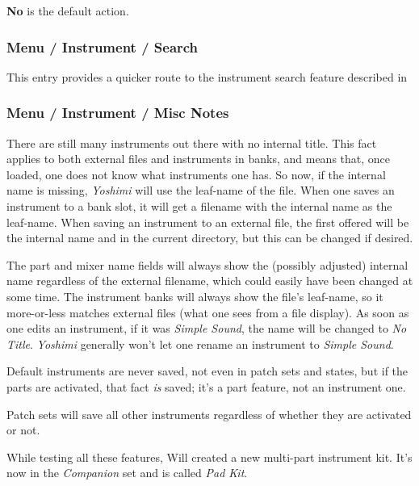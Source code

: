    \textbf{No} is the default action.

\subsubsection{Menu / Instrument / Search}
\label{subsubsec:menu_instrument_search}

   This entry provides a quicker route to the instrument search feature described
   in 
\subsubsection{Menu / Instrument / Misc Notes}
\label{subsubsec:menu_instrument_misc_notes}

   There are still many instruments out there with
   no internal title. This fact applies to both external files and instruments
   in banks, and means that, once loaded, one does not know what instruments
   one has. So now, if the internal name is missing, \textsl{Yoshimi} will use
   the leaf-name of the file.  When one saves an instrument to a bank slot, it
   will get a filename with the internal name as the leaf-name.  When saving
   an instrument to an external file, the first offered will be the internal
   name and in the current directory, but this can be changed if desired.

   The part and mixer name fields will always show the (possibly adjusted)
   internal name regardless of the external filename, which could easily have
   been changed at some time.  The instrument banks will always show the file's
   leaf-name, so it more-or-less matches external files (what one sees from a
   file display).  As soon as one edits an instrument, if it was \textsl{Simple
   Sound}, the name will be changed to \textsl{No Title}.  \textsl{Yoshimi}
   generally won't let one rename an instrument to \textsl{Simple Sound}.

   Default instruments are never saved, not even in patch sets and states, but
   if the parts are activated, that fact \textsl{is} saved; it's a part
   feature, not an instrument one.

   Patch sets will save all other instruments regardless of whether they are
   activated or not.

   While testing all these features, Will created a new multi-part instrument
   kit.  It's now in the \textsl{Companion} set and is called \textsl{Pad Kit}.

